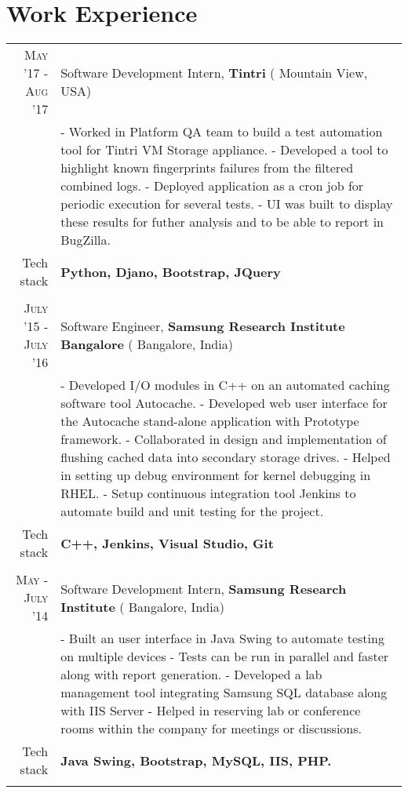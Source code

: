 \section{Work Experience}
\renewcommand{\arraystretch}{0.95}%
\begin{tabular}{r|p{14cm}}
\textsc{May '17 - Aug '17} & Software Development Intern, \textbf{Tintri} ( Mountain View, USA)\\
& \small{
- Worked in Platform QA team to build a test automation tool for Tintri VM Storage appliance.\newline
- Developed a tool to highlight known fingerprints failures from the filtered combined logs. \newline
- Deployed application as a cron job for periodic execution for several tests.\newline
- UI was built to display these results for futher analysis and to be able to report in BugZilla.} \\
\small{Tech stack} &\footnotesize{\textbf{Python, Djano, Bootstrap, JQuery}} \\
\multicolumn{2}{c}{} \\

\textsc{July '15 - July '16} & Software Engineer, \textbf{Samsung Research Institute Bangalore} ( Bangalore, India) \\
& \small{
- Developed I/O modules in C++ on an automated caching software tool Autocache.\newline
- Developed web user interface for the Autocache stand-alone application with Prototype framework.\newline
- Collaborated in design and implementation of flushing cached data into secondary storage drives.\newline
- Helped in setting up debug environment for kernel debugging in RHEL. \newline
- Setup continuous integration tool Jenkins to automate build and unit testing for the project.}\\
\small{Tech stack} &\footnotesize{\textbf{C++, Jenkins, Visual Studio, Git}} \\
\multicolumn{2}{c}{} \\


\textsc{May - July '14} & Software Development Intern, \textbf{Samsung Research Institute} ( Bangalore, India) \\
& \small{
- Built an user interface in Java Swing to automate testing on multiple devices \newline
- Tests can be run in parallel and faster along with report generation. \newline
- Developed a lab management tool integrating Samsung SQL database along with IIS Server \newline
- Helped in reserving lab or conference rooms within the company for meetings or discussions.}\\
\small{Tech stack} &\footnotesize{\textbf{Java Swing, Bootstrap, MySQL, IIS, PHP.}} \\
\multicolumn{2}{c}{} \\


\end{tabular}
